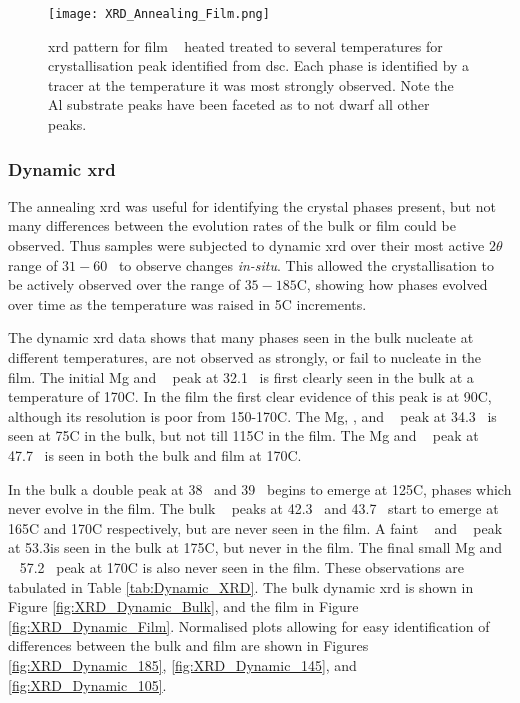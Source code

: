 \documentclass[draft,a4paper,12pt,oneside]{article}%
\begin{document}
\begin{figure}[b]
	\centering
	\texttt{[image: XRD\_Annealing\_Film.png]}
	\caption[Table of contents Capition]{\acrshort{xrd} pattern for film \MgZnCa~ heated treated to several temperatures for crystallisation peak identified from \acrshort{dsc}. Each phase is identified by a tracer at the temperature it was most strongly observed. Note the Al substrate peaks have been faceted as to not dwarf all other peaks.}
	\label{fig:XRD_Annealing_Film}
\end{figure}

\subsubsection{Dynamic \acrshort{xrd}}

The annealing \acrshort{xrd} was useful for identifying the crystal phases present, but not many differences between the evolution rates of the bulk or film could be observed. Thus samples were subjected to dynamic \acrshort{xrd} over their most active $2 \theta$ range of $31-60$\degree~ to observe changes \textit{in-situ}. This allowed the crystallisation to be actively observed over the range of $35-185$\degree C, showing how phases evolved over time as the temperature was raised in 5\degree C increments. 

The dynamic \acrshort{xrd} data shows that many phases seen in the bulk nucleate at different temperatures, are not observed as strongly, or fail to nucleate in the film. The initial Mg and \MgZn~ peak at 32.1\degree~ is first clearly seen in the bulk at a temperature of 170\degree C. In the film the first clear evidence of this peak is at 90\degree C, although its resolution is poor from 150-170\degree C. The Mg, \MgZn, and \CaMgZnFive~ peak at 34.3\degree~ is seen at 75\degree C in the bulk, but not till 115\degree C in the film. The Mg and \MgZn~ peak at 47.7\degree~ is seen in both the bulk and film at 170\degree C. 

In the bulk a double peak at 38\degree~ and 39\degree~ begins to emerge at 125\degree C, phases which never evolve in the film. The bulk \CaMgZnFive~ peaks at 42.3\degree~ and 43.7\degree~ start to emerge at 165\degree C and 170\degree C respectively, but are never seen in the film. A faint \MgZn~ and \CaMgZnFive~ peak at 53.3\degree is seen in the bulk at 175\degree C, but never in the film. The final small Mg and \MgZn~ 57.2\degree~ peak at 170\degree C is also never seen in the film. These observations are tabulated in Table \ref{tab:Dynamic_XRD}. The bulk dynamic \acrshort{xrd} is shown in Figure \ref{fig:XRD_Dynamic_Bulk}, and the film in Figure \ref{fig:XRD_Dynamic_Film}. Normalised plots allowing for easy identification of differences between the bulk and film are shown in Figures \ref{fig:XRD_Dynamic_185}, \ref{fig:XRD_Dynamic_145}, and \ref{fig:XRD_Dynamic_105}.
\end{document}
